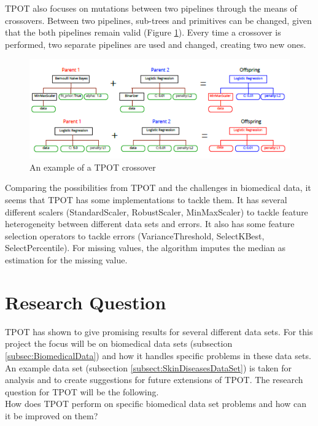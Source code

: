 \documentclass[10pt,a4paper]{article}
\begin{document}
	TPOT also focuses on mutations between two pipelines through the means of crossovers. Between two pipelines, sub-trees and primitives can be changed, given that the both pipelines remain valid (Figure \ref{fig:TPOTCrossover}). Every time a crossover is performed, two separate pipelines are used and changed, creating two new ones.
	
	\begin{figure}[h!]
		\includegraphics[scale=1]{TPOTCrossover.png}
		\caption{An example of a TPOT crossover \cite{Gijsbers2017Thesis}}
		\label{fig:TPOTCrossover}
	\end{figure}
	
	Comparing the possibilities from TPOT and the challenges in biomedical data, it seems that TPOT has some implementations to tackle them. It has several different scalers (StandardScaler, RobustScaler, MinMaxScaler) to tackle feature heterogeneity between different data sets and errors. It also has some feature selection operators to tackle errors (VarianceThreshold, SelectKBest, SelectPercentile). For missing values, the algorithm imputes the median as estimation for the missing value.
	
	\section{Research Question}
	\label{sec:ResearchQuestion}
	
	TPOT has shown to give promising results for several different data sets. \cite{Gijsbers2017Thesis} For this project the focus will be on biomedical data sets (subsection \ref{subsec:BiomedicalData}) and how it handles specific problems in these data sets. An example data set (subsection \ref{subsect:SkinDiseasesDataSet}) is taken for analysis and to create suggestions for future extensions of TPOT. The research question for TPOT will be the following.\\
	
	How does TPOT perform on specific biomedical data set problems and how can it be improved on them?\\
	
\end{document}
